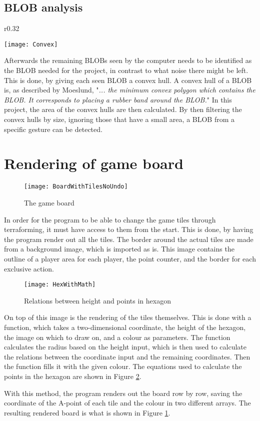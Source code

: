 \subsection{BLOB analysis}
\begin{wrapfigure}{r}{0.32\textwidth}
\begin{center}
\texttt{[image: Convex]}
\end{center}
\caption{The convex hull of a hand \label{Fig:Convex}}
\end{wrapfigure}
Afterwards the remaining BLOBs seen by the computer needs to be identified as the BLOB needed for the project, in contrast to what noise there might be left. This is done, by giving each seen BLOB a convex hull. A convex hull of a BLOB is, as described by Moeslund, "\textit{... the minimum convex polygon which contains the BLOB. It corresponds to placing a rubber band around the BLOB.}" \citep{moeslund_introduction_2012} In this project, the area of the convex hulls are then calculated. By then filtering the convex hulls by size, ignoring those that have a small area, a BLOB from a specific gesture can be detected.

\section{Rendering of game board}
\begin{figure}[h!]
\centering \texttt{[image: BoardWithTilesNoUndo]}
\caption{The game board \label{Fig:Board}}
\end{figure}
In order for the program to be able to change the game tiles through terraforming, it must have access to them from the start. This is done, by having the program render out all the tiles. The border around the actual tiles are made from a background image, which is imported as is. This image contains the outline of a player area for each player, the point counter, and the border for each exclusive action. 
\begin{figure}[h!]
\centering \texttt{[image: HexWithMath]}
\caption{Relations between height and points in hexagon \label{Fig:HexWithMath}}
\end{figure}

On top of this image is the rendering of the tiles themselves. This is done with a function, which takes a two-dimensional coordinate, the height of the hexagon, the image on which to draw on, and a colour as parameters. The function calculates the radius based on the height input, which is then used to calculate the relations between the coordinate input and the remaining coordinates. Then the function fills it with the given colour. The equations used to calculate the points in the hexagon are shown in Figure \ref{Fig:HexWithMath}.

With this method, the program renders out the board row by row, saving the coordinate of the A-point of each tile and the colour in two different arrays. The resulting rendered board is what is shown in Figure \ref{Fig:Board}.